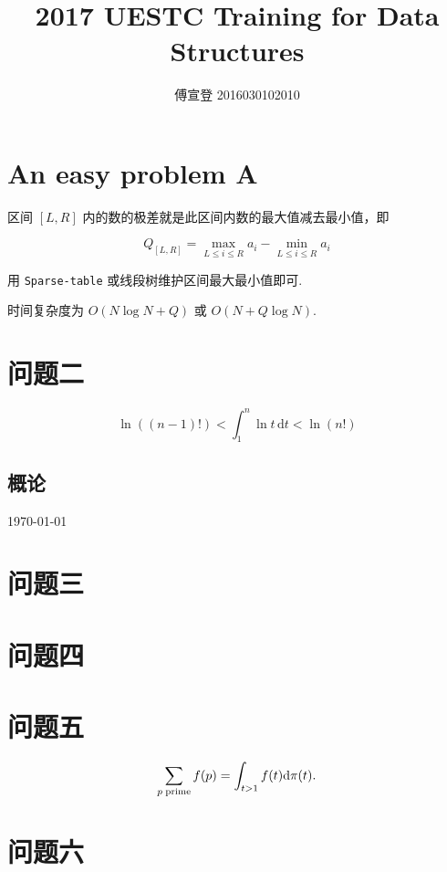 \documentclass[fontset=windowsnew,zihao=-4,scheme=chinese,punct=quanjiao,linespread=1,UTF8]{ctexart}
\begin{document}
\title{2017 UESTC Training for Data Structures}
\author{傅宣登 2016030102010}

\maketitle

\section{An easy problem A}

区间 $[L,R]$ 内的数的极差就是此区间内数的最大值减去最小值，即

\[
Q_{[L,R]} = \max_{L\le i \le R}{a_i} - \min_{L\le i \le R}{a_i}
\]

用 \verb|Sparse-table| 或线段树维护区间最大最小值即可.

时间复杂度为 $O(N\log{N}+Q)$ 或 $O(N+Q\log{N})$.

\section{问题二}

\begin{equation}
  \ln((n-1)!) < \int_1^n \ln t\,\mathrm{d}t < \ln(n!)
\end{equation}

\subsection{概论}


\today \figurename

\section{问题三}


\section{问题四}

\section{问题五}
\[
  \sum_{p\rm\;prime}f(p) = \int_{t>1}f(t)\mathrm{d}\pi(t).
\]

\section{问题六}
\end{document}
